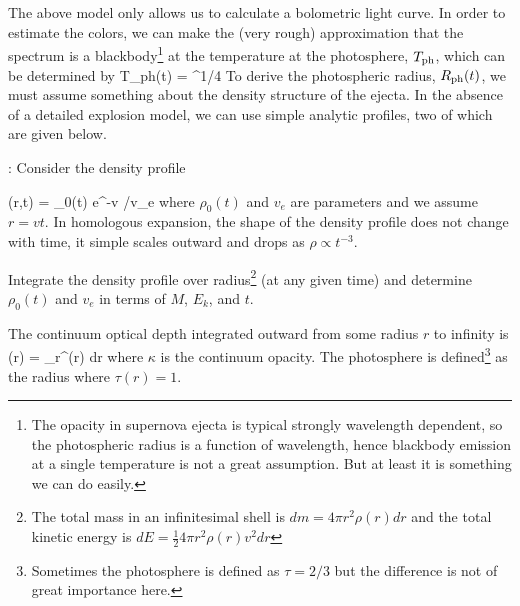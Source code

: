 \documentclass{tufte-handout}
\begin{document}
 The above model only allows us to calculate a bolometric light curve. In order to estimate the colors, we can make the (very rough) approximation that the spectrum is a blackbody\footnote{The opacity in supernova ejecta is typical strongly wavelength dependent, so the photospheric radius is a function of wavelength, hence blackbody emission
at a single temperature is not a great assumption. But at least it is something we can do easily.} at the  temperature at the photosphere, $T_{\rm ph}$, which can be determined by
\beq
T_{\rm ph}(t) = ^{1/4}
\eeq
To derive the photospheric radius, $R_{\rm ph}(t)$, we must assume something about
the density structure of the ejecta. In the absence of a detailed explosion model, we can
use simple analytic profiles, two of which are given below.

\addtocounter{subq}{1}
%

\bigskip {}: Consider the density profile

\beq
\rho(r,t) = \rho_0(t) e^{-v /v_e}
\eeq
where $\rho_0(t)$ and $v_e$ are parameters and we assume $r = vt$. In homologous expansion, the shape of the density profile does not change with time, it simple scales outward and drops as $\rho \propto t^{-3}$.

 Integrate the density profile over radius\footnote{The total mass in an infinitesimal shell is $dm = 4 \pi r^2 \rho(r) dr$ and the total kinetic energy is $dE =  \frac{1}{2} 4 \pi r^2 \rho(r)  v^2 dr$} (at any given time) and determine $\rho_0(t)$ and $v_e$ in terms of
$M$, $E_k$, and $t$.

\pp The continuum optical depth integrated outward from some radius $r$ to infinity is
\beq
\tau(r) = \int_r^\infty \rho(r) \kappa dr
\eeq
where $\kappa$ is the continuum opacity. The photosphere is defined\footnote{Sometimes the photosphere is defined as $\tau = 2/3$ but the difference is not of great importance here.} as the radius where $\tau(r) = 1$. 
\end{document}
